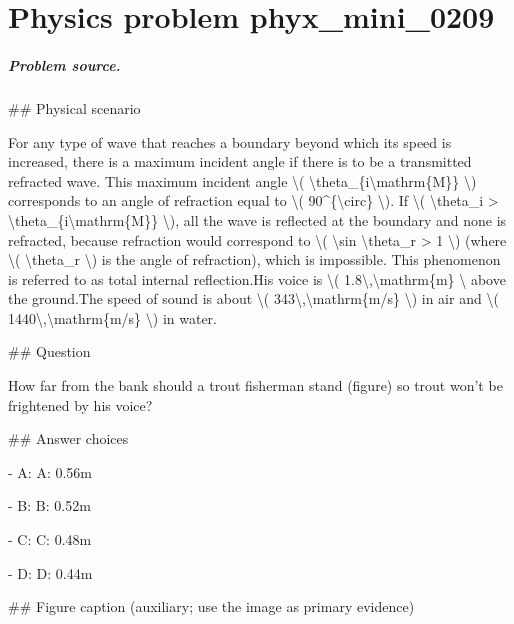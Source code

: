 
\chapter{Physics problem phyx\_mini\_0209}
\label{ch:PhyXMiniProblems_problem_phyx_mini_0209}

\paragraph{Problem source.}
\#\# Physical scenario

For any type of wave that reaches a boundary beyond which its speed is increased, there is a maximum incident angle if there is to be a transmitted refracted wave. This maximum incident angle \textbackslash{}( \textbackslash{}theta\_\{i\textbackslash{}mathrm\{M\}\} \textbackslash{}) corresponds to an angle of refraction equal to \textbackslash{}( 90\textasciicircum{}\{\textbackslash{}circ\} \textbackslash{}). If \textbackslash{}( \textbackslash{}theta\_i > \textbackslash{}theta\_\{i\textbackslash{}mathrm\{M\}\} \textbackslash{}), all the wave is reflected at the boundary and none is refracted, because refraction would correspond to \textbackslash{}( \textbackslash{}sin \textbackslash{}theta\_r > 1 \textbackslash{}) (where \textbackslash{}( \textbackslash{}theta\_r \textbackslash{}) is the angle of refraction), which is impossible. This phenomenon is referred to as total internal reflection.His voice is \textbackslash{}( 1.8\textbackslash{},\textbackslash{}mathrm\{m\} \textbackslash{} above the ground.The speed of sound is about \textbackslash{}( 343\textbackslash{},\textbackslash{}mathrm\{m/s\} \textbackslash{}) in air and \textbackslash{}( 1440\textbackslash{},\textbackslash{}mathrm\{m/s\} \textbackslash{}) in water.

\#\# Question

How far from the bank should a trout fisherman stand (figure) so trout won't be frightened by his voice?

\#\# Answer choices

- A: A: 0.56m

- B: B: 0.52m

- C: C: 0.48m

- D: D: 0.44m

\#\# Figure caption (auxiliary; use the image as primary evidence)

